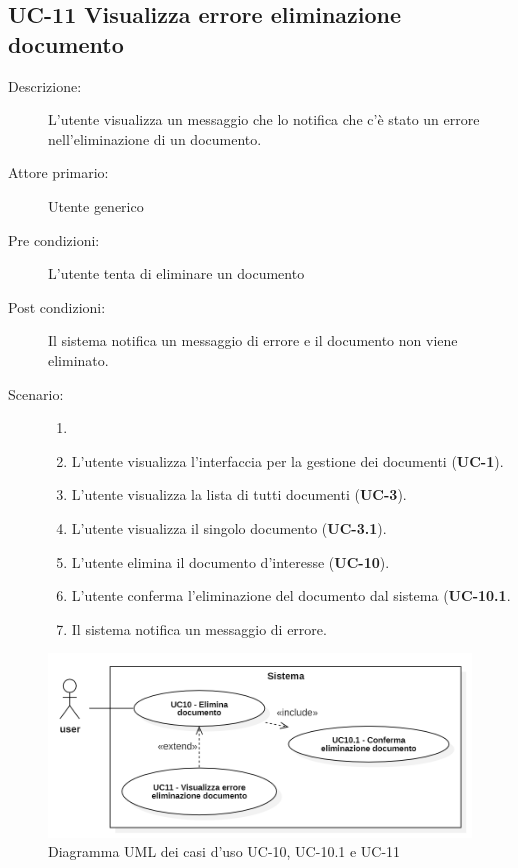\subsection{UC-11 Visualizza errore eliminazione documento}
\begin{description}
    \item[Descrizione:] L'utente visualizza un messaggio che lo notifica che c'è stato un errore nell'eliminazione di un documento.
    \item[Attore primario:] Utente generico
    \item[Pre condizioni:] L'utente tenta di eliminare un documento
    \item[Post condizioni:] Il sistema notifica un messaggio di errore e il documento non viene eliminato.
    \item[Scenario:] 
    \begin{enumerate}
        \item[] 
        \item L’utente visualizza l'interfaccia per la gestione dei documenti (\textbf{UC-1}).
        \item L’utente visualizza la lista di tutti documenti (\textbf{UC-3}).
        \item L'utente visualizza il singolo documento (\textbf{UC-3.1}).
        \item L'utente elimina il documento d'interesse (\textbf{UC-10}).
        \item L'utente conferma l'eliminazione del documento dal sistema (\textbf{UC-10.1}.
        \item Il sistema notifica un messaggio di errore.
    \end{enumerate}
\end{description}

\begin{figure}[H]
    \centering
    \includegraphics[width=0.8\linewidth]{UC10-11.png}
    \caption{Diagramma UML dei casi d'uso UC-10, UC-10.1 e UC-11}
    \label{fig:UC10-11}
\end{figure}

